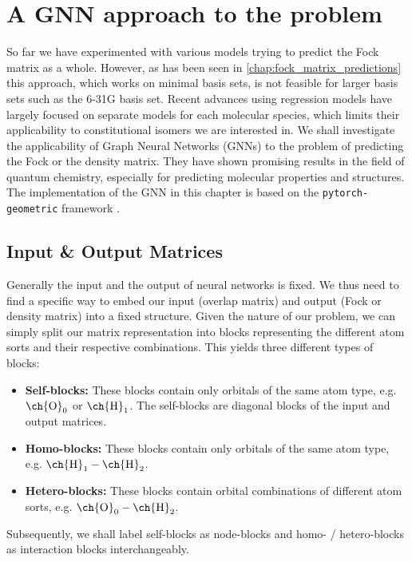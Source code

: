 \chapter{A GNN approach to the problem}
\label{chap:gnn}
So far we have experimented with various models trying to predict the Fock matrix as a whole. However, as has been seen in \autoref{chap:fock_matrix_predictions} this approach, which works on minimal basis sets, is not feasible for larger basis sets such as the 6-31G basis set. Recent advances using regression models have largely focused on separate models for each molecular species, which limits their applicability to constitutional isomers we are interested in. \parencite{ref:Hazra2024,ref:Shao2023}
We shall investigate the applicability of Graph Neural Networks (GNNs) to the problem of predicting the Fock or the density matrix. They have shown promising results in the field of quantum chemistry, especially for predicting molecular properties and structures. \parencite{ref:schnet2018}\\

The implementation of the GNN in this chapter is based on the \texttt{pytorch-geometric} framework \parencite{ref:PyTorchGeometric, ref:PyTorch_geom_paper}. 
\section{Input \& Output Matrices}
\label{sec:gnn_input_output_matrices}
Generally the input and the output of neural networks is fixed. We thus need to find a specific way to embed our input (overlap matrix) and output (Fock or density matrix) into a fixed structure. Given the nature of our problem, we can simply split our matrix representation into blocks representing the different atom sorts and their respective combinations. This yields three different types of blocks: 
\begin{itemize}
    \item \textbf{Self-blocks:} These blocks contain only orbitals of the same atom type, e.g. $\text{\ch{O}}_0$ or $\text{\ch{H}}_1$. The self-blocks are diagonal blocks of the input and output matrices.
    \item \textbf{Homo-blocks:} These blocks contain only orbitals of the same atom type, e.g. $\text{\ch{H}}_1 - \text{\ch{H}}_2$.
    \item \textbf{Hetero-blocks:} These blocks contain orbital combinations of different atom sorts, e.g. $\text{\ch{O}}_0 - \text{\ch{H}}_2$.
\end{itemize}
Subsequently, we shall label self-blocks as node-blocks and homo- / hetero-blocks as interaction blocks interchangeably. 

